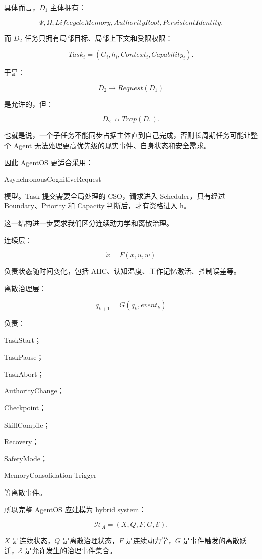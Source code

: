 具体而言，$D_1$ 主体拥有：

\[
\Psi,\Omega,
LifecycleMemory,
AuthorityRoot,
PersistentIdentity.
\]

而 $D_2$ 任务只拥有局部目标、局部上下文和受限权限：

\[
Task_i
=
(G_i,h_i,Context_i,Capability_i).
\]

于是：

\[
D_2
\rightarrow
Request(D_1)
\]

是允许的，但：

\[
\boxed{
D_2
\nrightarrow
Trap(D_1).
}
\]

也就是说，一个子任务不能同步占据主体直到自己完成，否则长周期任务可能让整个 Agent 无法处理更高优先级的现实事件、自身状态和安全需求。

因此 AgentOS 更适合采用：

\begin{statementbox}
AsynchronousCognitiveRequest
\end{statementbox}

模型。Task 提交需要全局处理的 CSO，请求进入 Scheduler，只有经过 Boundary、Priority 和 Capacity 判断后，才有资格进入 h。

这一结构进一步要求我们区分连续动力学和离散治理。

连续层：

\[
\dot x
=
F(x,u,w)
\]

负责状态随时间变化，包括 AHC、认知温度、工作记忆激活、控制误差等。

离散治理层：

\[
q_{k+1}
=
G(q_k,event_k)
\]

负责：

TaskStart；

TaskPause；

TaskAbort；

AuthorityChange；

Checkpoint；

SkillCompile；

Recovery；

SafetyMode；

MemoryConsolidation Trigger

等离散事件。

所以完整 AgentOS 应建模为 hybrid system：

\[
\boxed{
\mathcal{H}_A
=
(X,Q,F,G,\mathcal{E}).
}
\]

$X$ 是连续状态，$Q$ 是离散治理状态，$F$ 是连续动力学，$G$ 是事件触发的离散跃迁，$\mathcal{E}$ 是允许发生的治理事件集合。

